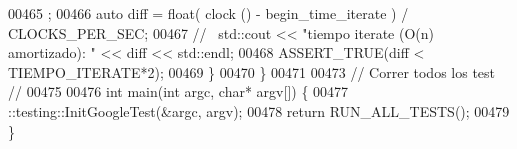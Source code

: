 \begin{DoxyCode}
00465             ;
00466         \textcolor{keyword}{auto} diff = float( clock () - begin\_time\_iterate ) /  CLOCKS\_PER\_SEC;
00467         \textcolor{comment}{//~ std::cout << "tiempo iterate (O(n) amortizado): " << diff << std::endl;}
00468         ASSERT\_TRUE(diff < TIEMPO\_ITERATE*2);
00469     \}
00470 \}
00471 
00473 \textcolor{comment}{// Correr todos los test //}
00475 \textcolor{comment}{}
00476 \textcolor{keywordtype}{int} main(\textcolor{keywordtype}{int} argc, \textcolor{keywordtype}{char}* argv[]) \{
00477     ::testing::InitGoogleTest(&argc, argv);
00478   \textcolor{keywordflow}{return} RUN\_ALL\_TESTS();
00479 \}
\end{DoxyCode}
